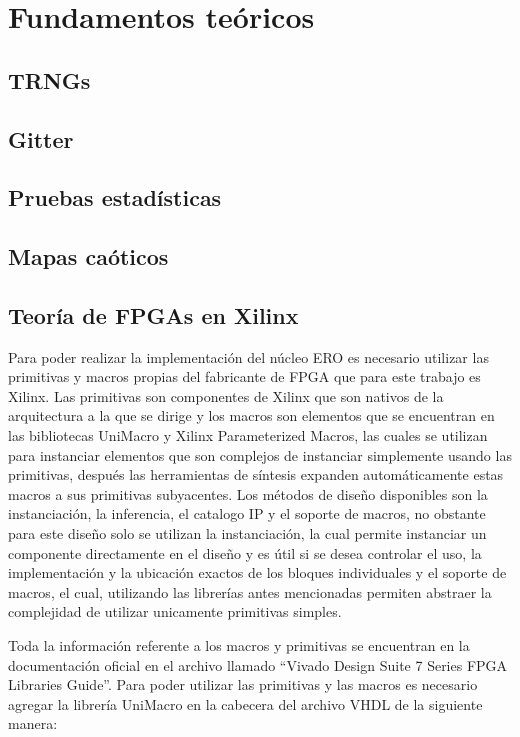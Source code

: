 \chapter{Fundamentos teóricos}
    \section{TRNGs}
    \section{Gitter}
    \section{Pruebas estadísticas}
    \section{Mapas caóticos}


    \section{Teoría de FPGAs en Xilinx}
        Para poder realizar la implementación del núcleo ERO es necesario utilizar las primitivas y macros propias del fabricante de FPGA que para este trabajo es Xilinx. Las primitivas son componentes de Xilinx que son nativos de la arquitectura a la que se dirige y los macros son elementos que se encuentran en las bibliotecas UniMacro y Xilinx Parameterized Macros, las cuales se utilizan para instanciar elementos que son complejos de instanciar simplemente usando las primitivas, después las herramientas de síntesis expanden automáticamente estas macros a sus primitivas subyacentes. Los métodos de diseño disponibles son la instanciación, la inferencia, el catalogo IP y el soporte de macros, no obstante para este diseño solo se utilizan la instanciación, la cual permite instanciar un componente directamente en el diseño y es útil si se desea controlar el uso, la implementación y la ubicación exactos de los bloques individuales y el soporte de macros, el cual, utilizando las librerías antes mencionadas permiten abstraer la complejidad de utilizar unicamente primitivas simples.

        Toda la información referente a los macros y primitivas se encuentran en la documentación oficial en el archivo llamado ``Vivado Design Suite 7 Series FPGA Libraries Guide''. Para poder utilizar las primitivas y las macros es necesario agregar la librería UniMacro en la cabecera del archivo VHDL de la siguiente manera: 

